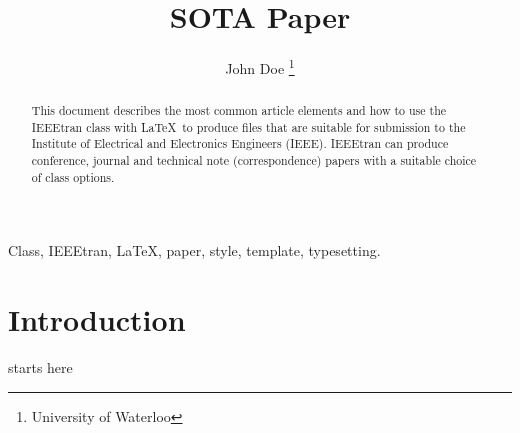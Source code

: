 \documentclass[lettersize,journal]{IEEEtran}
\begin{document}
\title{\gls{SOTA} Paper}
\author{John Doe \thanks{University of Waterloo}}
 

\maketitle


\begin{abstract}
This document describes the most common article elements and how to use the IEEEtran class with \LaTeX \ to produce files that are suitable for submission to the Institute of Electrical and Electronics Engineers (IEEE).  IEEEtran can produce conference, journal and technical note (correspondence) papers with a suitable choice of class options.
\end{abstract}

\begin{IEEEkeywords}
Class, IEEEtran, \LaTeX, paper, style, template, typesetting.
\end{IEEEkeywords}


\section{Introduction}
 starts here
\end{document}
